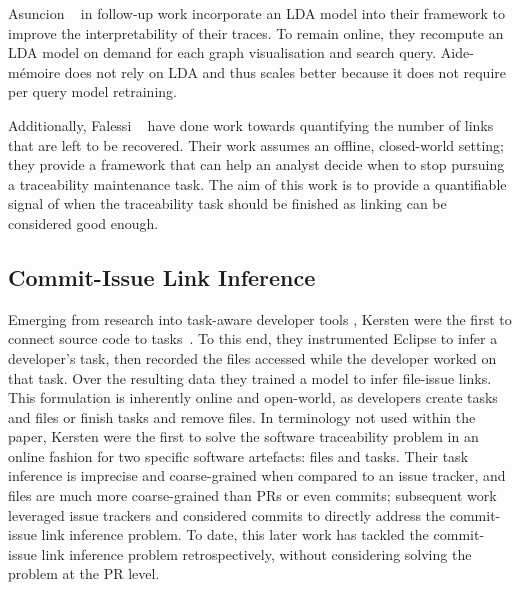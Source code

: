 Asuncion \etal~\cite{TopicTraceability} in follow-up work incorporate an LDA
model into their framework to improve the interpretability of their traces. To
remain online, they recompute an LDA model on demand for each graph
visualisation and search query. Aide-mémoire does not rely on LDA and thus
scales better because it does not require per query model retraining.

Additionally, Falessi \etal~\cite{Falessi2017} have done work towards
quantifying the number of links that are left to be recovered. Their work
assumes an offline, closed-world setting; they provide a framework that can help
an analyst decide when to stop pursuing a traceability maintenance task. The aim
of this work is to provide a quantifiable signal of when the traceability task
should be finished as linking can be considered good enough.

\subsection{Commit-Issue Link Inference}
\label{chapter:literature:sec:am_rel_work:cli}

Emerging from research into task-aware developer tools
\cite{Robillard:2003:FTL:776816.776969}, Kersten \etal were the first to connect
source code to tasks~\cite{Kersten2005}. To this end, they instrumented Eclipse
to infer a developer's task, then recorded the files accessed while the
developer worked on that task. Over the resulting data they trained a model to
infer file-issue links. This formulation is inherently online and open-world, as
developers create tasks and files or finish tasks and remove files. In
terminology not used within the paper, Kersten \etal were the first to solve the
software traceability problem in an online fashion for two specific software
artefacts: files and tasks. Their task inference is imprecise and coarse-grained
when compared to an issue tracker, and files are much more coarse-grained than
PRs or even commits; subsequent work leveraged issue trackers and considered
commits to directly address the commit-issue link inference problem. To date,
this later work has tackled the commit-issue link inference problem
retrospectively, without considering solving the problem at the PR level. 

